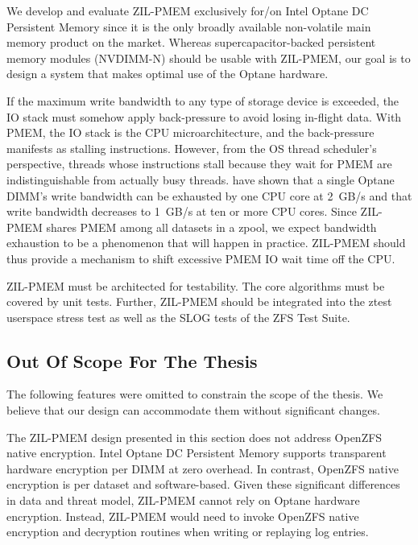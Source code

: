 \documentclass[12pt,a4paper,twoside]{book}
\begin{document}
{
We develop and evaluate ZIL-PMEM exclusively for/on Intel Optane DC Persistent Memory since it is the only broadly available non-volatile main memory product on the market.
Whereas supercapacitor-backed persistent memory modules (NVDIMM-N) should be usable with ZIL-PMEM, our goal is to design a system that makes optimal use of the Optane hardware.

If the maximum write bandwidth to any type of storage device is exceeded, the IO stack must somehow apply back-pressure to avoid losing in-flight data.
With PMEM, the IO stack is the CPU microarchitecture, and the back-pressure manifests as stalling instructions.
However, from the OS thread scheduler's perspective, threads whose instructions stall because they wait for PMEM are indistinguishable from actually busy threads.
\citeauthor{yangEmpiricalGuideBehavior2020} have shown that a single Optane DIMM's write bandwidth can be exhausted by one CPU core at 2~GB/s and that write bandwidth decreases to 1~GB/s at ten or more CPU cores.
Since ZIL-PMEM shares PMEM among all datasets in a zpool, we expect bandwidth exhaustion to be a phenomenon that will happen in practice.
ZIL-PMEM should thus provide a mechanism to shift excessive PMEM IO wait time off the CPU.

ZIL-PMEM must be architected for testability.
The core algorithms must be covered by unit tests.
Further, ZIL-PMEM should be integrated into the ztest userspace stress test as well as the SLOG tests of the ZFS Test Suite.

\subsection{Out Of Scope For The Thesis}
The following features were omitted to constrain the scope of the thesis.
We believe that our design can accommodate them without significant changes.

The ZIL-PMEM design presented in this section does not address OpenZFS native encryption.
Intel Optane DC Persistent Memory supports transparent hardware encryption per DIMM at zero overhead.
In contrast, OpenZFS native encryption is per dataset and software-based.
Given these significant differences in data and threat model, ZIL-PMEM cannot rely on Optane hardware encryption.
Instead, ZIL-PMEM would need to invoke OpenZFS native encryption and decryption routines when writing or replaying log entries.

}
\end{document}
